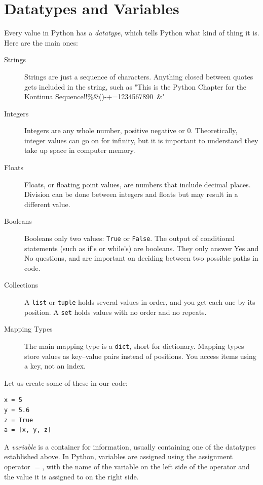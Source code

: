 \section{Datatypes and Variables}

Every value in Python has a \emph{datatype}, which tells Python what kind of thing it is. Here are the main ones:
\begin{description}
    \item[Strings] Strings are just a sequence of characters. Anything closed between quotes gets included in the string, such as "This is the Python Chapter for the Kontinua Sequence!!\%\^\&\*()-+=1234567890~\&"
    \item[Integers] Integers are any whole number, positive negative or 0. Theoretically, integer values can go on for infinity, but it is important to understand they take up space in computer memory.
    \item[Floats]  Floats, or floating point values, are numbers that include decimal places. Division can be done between integers and floats but may result in a different value.
    \item[Booleans] Booleans only two values: \texttt{True} or \texttt{False}. The output of conditional statements (such as if's or while's) are booleans. They only answer Yes and No questions, and are important on deciding between two possible paths in code.
    \item[Collections] A \texttt{list} or \texttt{tuple} holds several values in order, and you get each one by its position. A \texttt{set} holds values with no order and no repeats. 
    \item[Mapping Types] The main mapping type is a \texttt{dict}, short for dictionary. Mapping types store values as key–value pairs instead of positions. You access items using a key, not an index.
\end{description}

Let us create some of these in our code:
\begin{verbatim}
x = 5
y = 5.6
z = True
a = [x, y, z]
\end{verbatim}

A \emph{variable} is a container for information, usually containing one of the datatypes established above. In Python, variables are assigned using the assignment operator $=$, with the name of the variable on the left side of the operator and the value it is assigned to on the right side. 

